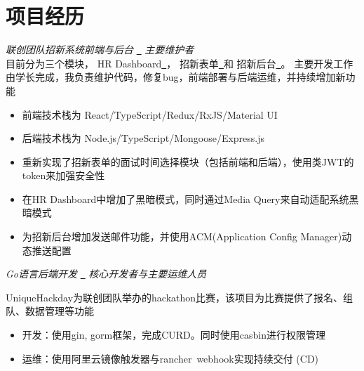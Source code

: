 \documentclass{uniquecv}
\begin{document}

\section{项目经历}

{\it 联创团队招新系统前端与后台}
\quad \href{https://github.com/UniqueStudio/UniqueRecruitmentDashboard}{{\color{gray}{\faLink}}~}
\quad \emph{主要维护者}
\vspace{0.4ex}
\\
目前分为三个模块，
{HR Dashboard}\href{https://hr.hustunique.com}{{\color{gray}{\faLink}}~}，
{招新表单}\href{https://join.hustunique.com}{{\color{gray}{\faLink}}~}和
{招新后台}\href{https://github.com/UniqueStudio/UniqueRecruitmentBackend}{{\color{gray}{\faLink}}~}。
主要开发工作由学长完成，我负责维护代码，修复bug，前端部署与后端运维，并持续增加新功能

\begin{itemize}
  \item 前端技术栈为 React/TypeScript/Redux/RxJS/Material UI
  \item 后端技术栈为 Node.js/TypeScript/Mongoose/Express.js
  \item 重新实现了招新表单的面试时间选择模块（包括前端和后端），使用类JWT的token来加强安全性
  \item 在HR Dashboard中增加了黑暗模式，同时通过Media Query来自动适配系统黑暗模式
  \item 为招新后台增加发送邮件功能，并使用ACM(Application Config Manager)动态推送配置
\end{itemize}

\textit{Go语言后端开发}
\quad \href{https://github.com/colinaaa/UniqueHackDayDashboard-backend}{{\color{gray}{\faLink}}~}
\quad \emph{核心开发者与主要运维人员}
\vspace{0.4ex}

UniqueHackday为联创团队举办的hackathon比赛，该项目为比赛提供了报名、组队、数据管理等功能
\begin{itemize}
  \item 开发：使用gin, gorm框架，完成CURD。同时使用casbin进行权限管理
  \item 运维：使用阿里云镜像触发器与rancher\ webhook实现持续交付 (CD)
\end{itemize}
\end{document}
